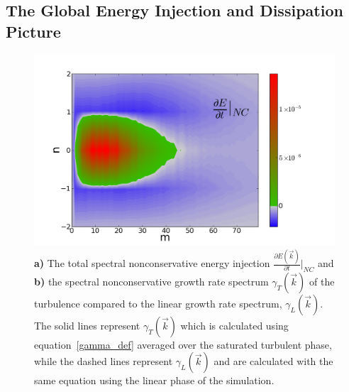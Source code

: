 \documentclass[showpacs,preprintnumbers,amsmath,amssymb,superscriptaddress]{revtex4}
\newcommand{\pdiff}[2]{\frac{\partial#1}{\partial#2}}
\begin{document}
\subsection{The Global Energy Injection and Dissipation Picture}

\begin{figure}[!htbp]
\includegraphics[]{dEdt_nc}
\hfil
\caption{\textbf{a)} The total spectral nonconservative energy injection $\pdiff{E(\vec{k})}{t} \big|_{NC}$ and
\textbf{b)} the spectral nonconservative growth rate spectrum $\gamma_{T}(\vec{k})$ of the turbulence 
compared to the linear growth rate spectrum, $\gamma_L(\vec{k})$. 
The solid lines represent $\gamma_{T}(\vec{k})$ which is calculated using equation~\ref{gamma_def} averaged over the saturated turbulent phase, 
while the dashed lines represent $\gamma_L(\vec{k})$ and are calculated with the same equation using the linear phase of the simulation.}
\label{dEdt_tot_fig}
\end{figure}
\end{document}
